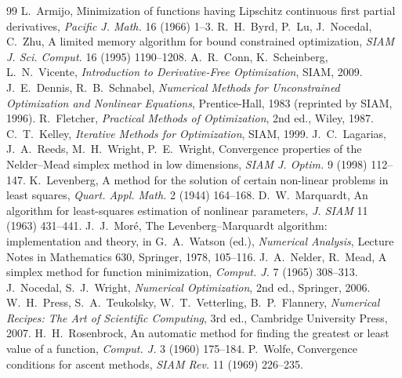 \begin{chapterbib}{99}
 L.~Armijo, Minimization of functions having Lipschitz continuous first partial derivatives, \emph{Pacific J. Math.} 16 (1966) 1--3.
 R.~H.~Byrd, P.~Lu, J.~Nocedal, C.~Zhu, A limited memory algorithm for bound constrained optimization, \emph{SIAM J. Sci. Comput.} 16 (1995) 1190--1208.
 A.~R.~Conn, K.~Scheinberg, L.~N.~Vicente, \emph{Introduction to Derivative-Free Optimization}, SIAM, 2009.
 J.~E.~Dennis, R.~B.~Schnabel, \emph{Numerical Methods for Unconstrained Optimization and Nonlinear Equations}, Prentice-Hall, 1983 (reprinted by SIAM, 1996).
 R.~Fletcher, \emph{Practical Methods of Optimization}, 2nd ed., Wiley, 1987.
 C.~T.~Kelley, \emph{Iterative Methods for Optimization}, SIAM, 1999.
 J.~C.~Lagarias, J.~A.~Reeds, M.~H.~Wright, P.~E.~Wright, Convergence properties of the Nelder--Mead simplex method in low dimensions, \emph{SIAM J. Optim.} 9 (1998) 112--147.
 K.~Levenberg, A method for the solution of certain non-linear problems in least squares, \emph{Quart. Appl. Math.} 2 (1944) 164--168.
 D.~W.~Marquardt, An algorithm for least-squares estimation of nonlinear parameters, \emph{J. SIAM} 11 (1963) 431--441.
 J.~J.~Mor\'e, The Levenberg--Marquardt algorithm: implementation and theory, in G.~A.~Watson (ed.), \emph{Numerical Analysis}, Lecture Notes in Mathematics 630, Springer, 1978, 105--116.
 J.~A.~Nelder, R.~Mead, A simplex method for function minimization, \emph{Comput. J.} 7 (1965) 308--313.
 J.~Nocedal, S.~J.~Wright, \emph{Numerical Optimization}, 2nd ed., Springer, 2006.
 W.~H.~Press, S.~A.~Teukolsky, W.~T.~Vetterling, B.~P.~Flannery, \emph{Numerical Recipes: The Art of Scientific Computing}, 3rd ed., Cambridge University Press, 2007.
 H.~H.~Rosenbrock, An automatic method for finding the greatest or least value of a function, \emph{Comput. J.} 3 (1960) 175--184.
 P.~Wolfe, Convergence conditions for ascent methods, \emph{SIAM Rev.} 11 (1969) 226--235.
\end{chapterbib}
